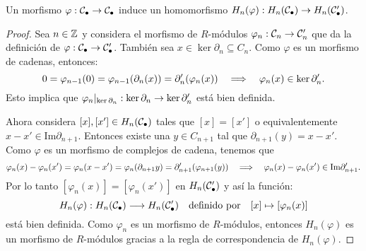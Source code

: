 \begin{ejercicio}\label{ej:57}
  Un morfismo $\varphi:\mathcal{C}_{\bullet}\rightarrow\mathcal{C}_{\bullet}$ induce un homomorfismo
  $H_n(\varphi):H_n(\mathcal{C}_{\bullet})\rightarrow H_n(\mathcal{C}'_{\bullet})$.
\end{ejercicio}
\begin{proof}%
  Sea $n\in\mathbb{Z}$ y considera el morfismo de $R$-m\'odulos $\varphi_n:\mathcal{C}_n\rightarrow\mathcal{C}'_n$ que da la definici\'on de
  $\varphi:\mathcal{C}_{\bullet}\rightarrow\mathcal{C}'_{\bullet}$. Tambi\'en sea $x\in\ker\partial_n\subseteq C_n$. Como $\varphi$ es
  un morfismo de cadenas, entonces:
  \[
    0=\varphi_{n-1}(0)=\varphi_{n-1}(\partial_n(x))=\partial'_n(\varphi_n(x)) \quad\Longrightarrow\quad \varphi_n(x)\in\ker\partial'_n.
  \]
  Esto implica que $\varphi_n|_{\ker\partial_n}:\ker\partial_n\rightarrow\ker\partial'_n$ est\'a bien definida.

  Ahora considera $[x],[x']\in H_n(\mathcal{C}_{\bullet})$ tales que $[x]=[x']$ o equivalentemente $x-x'\in\text{Im}\partial_{n+1}$.
  Entonces existe una $y\in C_{n+1}$ tal que $\partial_{n+1}(y)=x-x'$. Como $\varphi$ es un morfismo de complejos
  de cadena, tenemos que
  \[
    \varphi_n(x)-\varphi_n(x')=\varphi_n(x-x')=\varphi_n(\partial_{n+1}y)=\partial'_{n+1}(\varphi_{n+1}(y)) \quad\Longrightarrow\quad
    \varphi_n(x)-\varphi_n(x')\in\text{Im}\partial'_{n+1}.
  \]
  Por lo tanto $[\varphi_n(x)]=[\varphi_n(x')]$ en $H_n(\mathcal{C}'_{\bullet})$ y as\'i la funci\'on:
  \[
    H_n(\varphi):H_n(\mathcal{C}_{\bullet})\longrightarrow H_n(\mathcal{C}'_{\bullet}) \quad\text{definido por}\quad [x] \mapsto [\varphi_n(x)]
  \]
  est\'a bien definida. Como $\varphi_n$ es un morfismo de $R$-m\'odulos, entonces $H_n(\varphi)$ es un morfismo de
  $R$-m\'odulos gracias a la regla de correspondencia de $H_n(\varphi)$.
\end{proof}%

